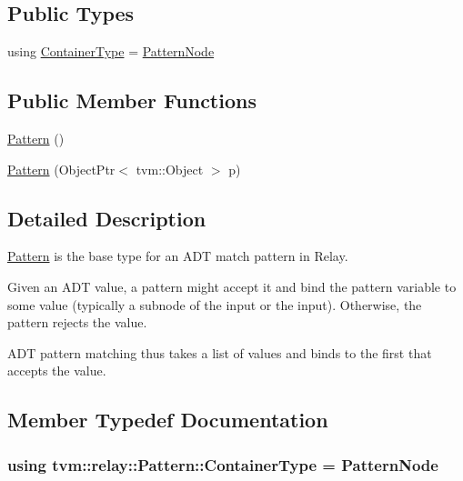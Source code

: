 \subsection*{Public Types}
\begin{DoxyCompactItemize}
\item 
using \hyperlink{classtvm_1_1relay_1_1Pattern_affbbf40e45c1f0fff2c97ee871c38fdf}{Container\+Type} = \hyperlink{classtvm_1_1relay_1_1PatternNode}{Pattern\+Node}
\end{DoxyCompactItemize}
\subsection*{Public Member Functions}
\begin{DoxyCompactItemize}
\item 
\hyperlink{classtvm_1_1relay_1_1Pattern_aba2fe5ab04ab0b56ff855cfc572b16ff}{Pattern} ()
\item 
\hyperlink{classtvm_1_1relay_1_1Pattern_ad2eae0030bb557fbee1b85517cd9c31e}{Pattern} (Object\+Ptr$<$ tvm\+::\+Object $>$ p)
\end{DoxyCompactItemize}


\subsection{Detailed Description}
\hyperlink{classtvm_1_1relay_1_1Pattern}{Pattern} is the base type for an A\+DT match pattern in Relay. 

Given an A\+DT value, a pattern might accept it and bind the pattern variable to some value (typically a subnode of the input or the input). Otherwise, the pattern rejects the value.

A\+DT pattern matching thus takes a list of values and binds to the first that accepts the value. 

\subsection{Member Typedef Documentation}
\subsubsection[{\texorpdfstring{Container\+Type}{ContainerType}}]{\setlength{\rightskip}{0pt plus 5cm}using {\bf tvm\+::relay\+::\+Pattern\+::\+Container\+Type} =  {\bf Pattern\+Node}}\hypertarget{classtvm_1_1relay_1_1Pattern_affbbf40e45c1f0fff2c97ee871c38fdf}{}\label{classtvm_1_1relay_1_1Pattern_affbbf40e45c1f0fff2c97ee871c38fdf}


